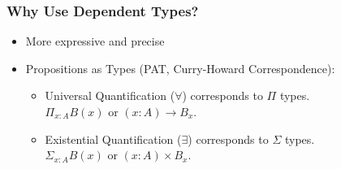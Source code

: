 \documentclass{beamer}
\begin{document}
\begin{frame}\frametitle{Why Use Dependent Types?}
\begin{itemize}
\item More expressive and precise
\item Propositions as Types (PAT, Curry-Howard Correspondence):
\begin{itemize}
\item Universal Quantification ($\forall$) corresponds to $\Pi$ types.\\
  $\Pi_{x : A} B(x)$ or $(x : A) \to B_x$.
\item Existential Quantification ($\exists$) corresponds to $\Sigma$ types.\\
  $\Sigma_{x : A} B(x)$ or $(x : A) \times B_x$.
\end{itemize}
\end{itemize}
\end{frame}
\end{document}

